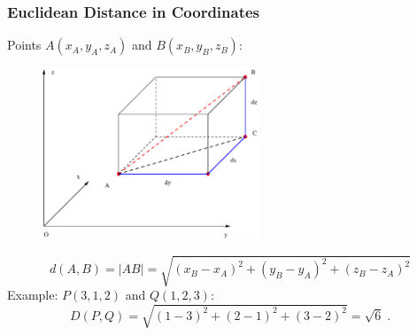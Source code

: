 \begin{frame}[label=current]
 \frametitle{Euclidean Distance in Coordinates}

   Points $A(x_A,y_A,z_A)$ and $B(x_B,y_B,z_B)$:
\begin{figure}[h]
  \includegraphics[height=2in]{../images/euclidean_distance.eps}
\end{figure}
%
$$d(A,B) = |AB| = \sqrt{(x_B-x_A)^2+(y_B-y_A)^2+(z_B-z_A)^2}$$
%
Example: $P(3,1,2)$ and $Q(1,2,3)$:\pause
%
$$D(P,Q) = \sqrt{(1-3)^2+(2-1)^2+(3-2)^2} = \sqrt{6}\; .$$

\end{frame}


